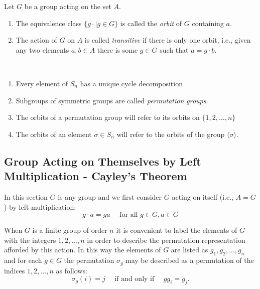 \documentclass[../main]{subfiles}
\begin{document}
 
 \begin{dfn}
  Let $G$ be a group acting on the set $A$.
  \begin{enumerate}
   \item The equivalence class $\{g\cdot \mid g\in G\}$ is called the \textit{orbit} of $G$ containing $a$.
   \item The action of $G$ on $A$ is called \textit{transitive} if there is only one orbit, i.e., given any two elements $a,b\in A$ there is some $g\in G$ such that $a=g\cdot b$.
  \end{enumerate}
 \end{dfn}
 
 
 \begin{nt}
  ~\begin{enumerate}
    \item Every element of $S_n$ has a unique cycle decomposition
    \item Subgroups of symmetric groups are called \textit{permutation groups}.
    \item The orbits of a permutation group will refer to its orbits on $\{1,2,\ldots,n\}$
    \item The orbits of an element $\sigma \in S_n$ will refer to the orbits of the group $\langle \sigma \rangle$.
   \end{enumerate}
 \end{nt}
 
 
 \subsection{Group Acting on Themselves by Left Multiplication - Cayley's Theorem}
 
 
 
 \begin{nt}
  In this section $G$ is any group and we first consider $G$ acting on itself (i.e., $A=G$) by left multiplication:
  \[g \cdot a=g a \quad \text { for all } g \in G, a \in G\]

When $G$ is a finite group of order $n$ it is convenient to label the elements of $G$ with the integers $1,2, \ldots, n$ in order to describe the permutation representation afforded by this action. In this way the elements of $G$ are listed as $g_1, g_2, \ldots, g_n$ and for each $g \in G$ the permutation $\sigma_g$ may be described as a permutation of the indices $1,2, \ldots, n$ as follows:
\[\sigma_g(i)=j \quad \text { if and only if } \quad g g_i=g_j.\]
 \end{nt}
 
\end{document}
